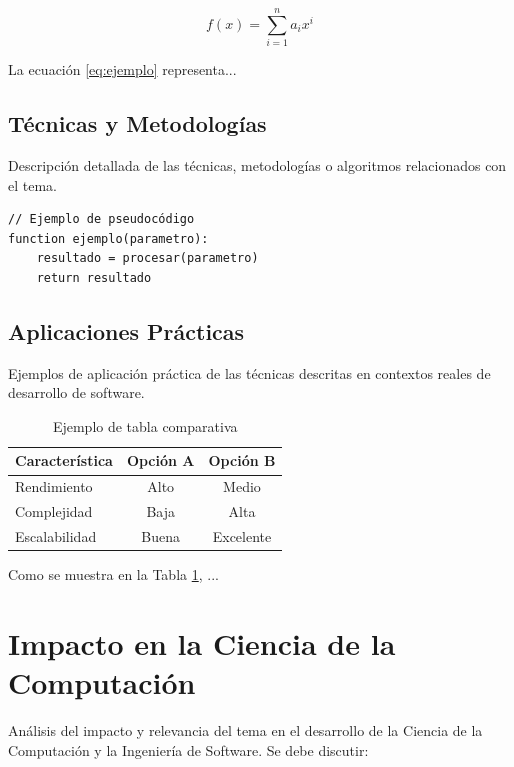 \documentclass[12pt,a4paper]{article}
\begin{document}
\begin{equation}
    f(x) = \sum_{i=1}^{n} a_i x^i
    \label{eq:ejemplo}
\end{equation}

La ecuación \ref{eq:ejemplo} representa...

\subsection{Técnicas y Metodologías}

Descripción detallada de las técnicas, metodologías o algoritmos relacionados con el tema.

\begin{verbatim}
// Ejemplo de pseudocódigo
function ejemplo(parametro):
    resultado = procesar(parametro)
    return resultado
\end{verbatim}

\subsection{Aplicaciones Prácticas}

Ejemplos de aplicación práctica de las técnicas descritas en contextos reales de desarrollo de software.

\begin{table}[H]
    \centering
    \caption{Ejemplo de tabla comparativa}
    \label{tab:ejemplo}
    \begin{tabular}{|l|c|c|}
        \hline
        \textbf{Característica} & \textbf{Opción A} & \textbf{Opción B} \\
        \hline
        Rendimiento & Alto & Medio \\
        Complejidad & Baja & Alta \\
        Escalabilidad & Buena & Excelente \\
        \hline
    \end{tabular}
\end{table}

Como se muestra en la Tabla \ref{tab:ejemplo}, ...

\section{Impacto en la Ciencia de la Computación}

Análisis del impacto y relevancia del tema en el desarrollo de la Ciencia de la Computación y la Ingeniería de Software. Se debe discutir:
\end{document}
